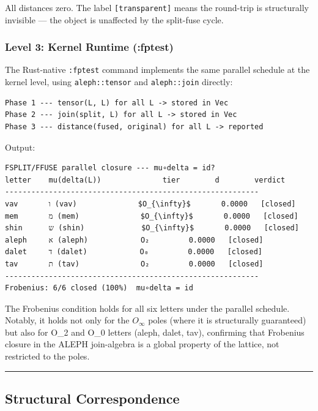 \documentclass[12pt,a4paper]{article}
\begin{document}
All distances zero. The label \texttt{{[}transparent{]}} means the round-trip is structurally invisible --- the object is unaffected by the split-fuse cycle.

\subsubsection{Level 3: Kernel Runtime (:fptest)}

The Rust-native \texttt{:fptest} command implements the same parallel schedule at the kernel level, using \texttt{aleph::tensor} and \texttt{aleph::join} directly:

\begin{lstlisting}
Phase 1 --- tensor(L, L) for all L -> stored in Vec
Phase 2 --- join(split, L) for all L -> stored in Vec
Phase 3 --- distance(fused, original) for all L -> reported
\end{lstlisting}

Output:

\begin{lstlisting}
FSPLIT/FFUSE parallel closure --- mu∘delta = id?
letter    mu(delta(L))              tier        d        verdict
----------------------------------------------------------
vav       ו (vav)              $O_{\infty}$       0.0000   [closed]
mem       מ (mem)              $O_{\infty}$       0.0000   [closed]
shin      ש (shin)             $O_{\infty}$       0.0000   [closed]
aleph     א (aleph)            O₂         0.0000   [closed]
dalet     ד (dalet)            O₀         0.0000   [closed]
tav       ת (tav)              O₂         0.0000   [closed]
----------------------------------------------------------
Frobenius: 6/6 closed (100%)  mu∘delta = id
\end{lstlisting}

The Frobenius condition holds for all six letters under the parallel schedule. Notably, it holds not only for the $O_{\infty}$ poles (where it is structurally guaranteed) but also for O\_2 and O\_0 letters (aleph, dalet, tav), confirming that Frobenius closure in the ALEPH join-algebra is a global property of the lattice, not restricted to the poles.

\begin{center}
\rule{0.5\textwidth}{0.4pt}
\end{center}

\subsection{Structural Correspondence}
\end{document}
